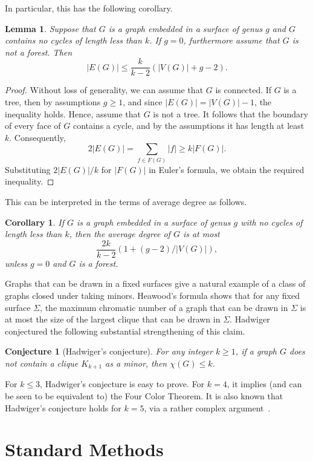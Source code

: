\documentclass[12pt,twoside,openright,a4paper]{book}
\newtheorem{lemma}[theorem]{Lemma}
\newtheorem{corollary}[theorem]{Corollary}
\newtheorem{conjecture}{Conjecture}[chapter]
\begin{document}
In particular, this has the following corollary.
\begin{lemma}\label{lemma:numedges}
Suppose that $G$ is a graph embedded in a surface of genus $g$ and $G$ contains no cycles of length less than $k$.
If $g=0$, furthermore assume that $G$ is not a forest. Then
$$|E(G)|\le \frac{k}{k-2}(|V(G)|+g-2).$$
\end{lemma}
\begin{proof}
Without loss of generality, we can assume that $G$ is connected.  If $G$ is a tree, then by assumptions
$g\ge 1$, and since $|E(G)|=|V(G)|-1$, the inequality holds.
Hence, assume that $G$ is not a tree.  It follows that the boundary
of every face of $G$ contains a cycle, and by the assumptions it has length at least $k$.
Consequently,
$$2|E(G)|=\sum_{f\in F(G)} |f|\ge k|F(G)|.$$
Substituting $2|E(G)|/k$ for $|F(G)|$ in Euler's formula, we obtain the required inequality.
\end{proof}

This can be interpreted in the terms of average degree as follows.
\begin{corollary}\label{cor:mad}
If $G$ is a graph embedded in a surface of genus $g$ with no cycles of length less than $k$,
then the average degree of $G$ is at most
$$\frac{2k}{k-2}(1+(g-2)/|V(G)|),$$
unless $g=0$ and $G$ is a forest.
\end{corollary}

Graphs that can be drawn in a fixed surfaces give a natural example of a class of graphs closed under taking minors.
Heawood's formula shows that for any fixed surface $\Sigma$, the maximum chromatic number of a graph that can be drawn in
$\Sigma$ is at most the size of the largest clique that can be drawn in $\Sigma$.  Hadwiger conjectured the following
substantial strengthening of this claim.

\begin{conjecture}[Hadwiger's conjecture]
For any integer $k\ge 1$, if a graph $G$ does not contain a clique $K_{k+1}$ as a minor, then $\chi(G)\le k$.
\end{conjecture}

For $k\le 3$, Hadwiger's conjecture is easy to prove.  For $k=4$, it implies (and can be seen to be equivalent to)
the Four Color Theorem.  It is also known that Hadwiger's conjecture holds for $k=5$, via a rather complex argument~\cite{robertsonseymourthomas}.

\part{Standard Methods}
\end{document}
